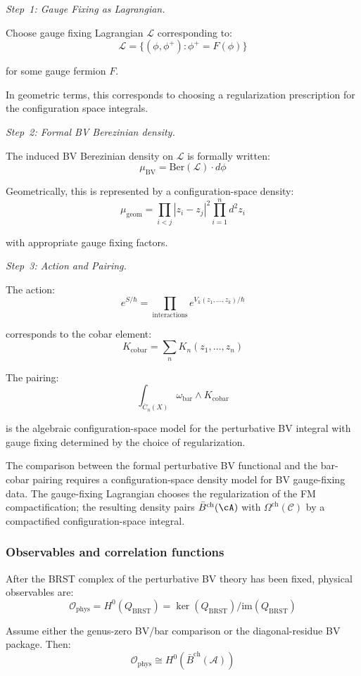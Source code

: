 \begin{remark}
\emph{Step~1: Gauge Fixing as Lagrangian.}

Choose gauge fixing Lagrangian $\mathcal{L}$ corresponding to:
\[\mathcal{L} = \{(\phi, \phi^+) : \phi^+ = F(\phi)\}\]

for some gauge fermion $F$.

In geometric terms, this corresponds to choosing a regularization prescription
for the configuration space integrals.

\emph{Step~2: Formal BV Berezinian density.}

The induced BV Berezinian density on $\mathcal{L}$ is formally written:
\[\mu_{\text{BV}} = \text{Ber}(\mathcal{L}) \cdot d\phi\]

Geometrically, this is represented by a configuration-space density:
\[\mu_{\text{geom}} = \prod_{i<j} |z_i - z_j|^2 \prod_{i=1}^n d^2z_i\]

with appropriate gauge fixing factors.

\emph{Step~3: Action and Pairing.}

The action:
\[e^{S/\hbar} = \prod_{\text{interactions}} e^{V_k(z_1, \ldots, z_k)/\hbar}\]

corresponds to the cobar element:
\[K_{\text{cobar}} = \sum_n K_n(z_1, \ldots, z_n)\]

The pairing:
\[\int_{\overline{C}_n(X)} \omega_{\text{bar}} \wedge K_{\text{cobar}}\]

is the algebraic configuration-space model for the perturbative BV
integral with gauge fixing determined by the choice of regularization.
\end{remark}

\begin{remark}
The comparison between the formal perturbative BV functional and the
bar-cobar pairing requires a configuration-space density model for BV
gauge-fixing data. The gauge-fixing Lagrangian chooses the
regularization of the FM compactification; the resulting density pairs
$\bar{B}^{\mathrm{ch}}(\cA)$ with
$\Omega^{\mathrm{ch}}(\mathcal{C})$ by a compactified
configuration-space integral.
\end{remark}

\subsubsection{Observables and correlation functions}

\begin{theorem}
\label{thm:observables-brst-cohomology}
After the BRST complex of the perturbative BV theory has been fixed,
physical observables are:
\[\mathcal{O}_{\text{phys}} = H^0(Q_{\text{BRST}}) =
\ker(Q_{\text{BRST}})/\text{im}(Q_{\text{BRST}})\]

Assume either the genus-zero BV/bar comparison or the
diagonal-residue BV package. Then:
\[\mathcal{O}_{\text{phys}} \cong H^0(\bar{B}^{\text{ch}}(\mathcal{A}))\]
\end{theorem}

